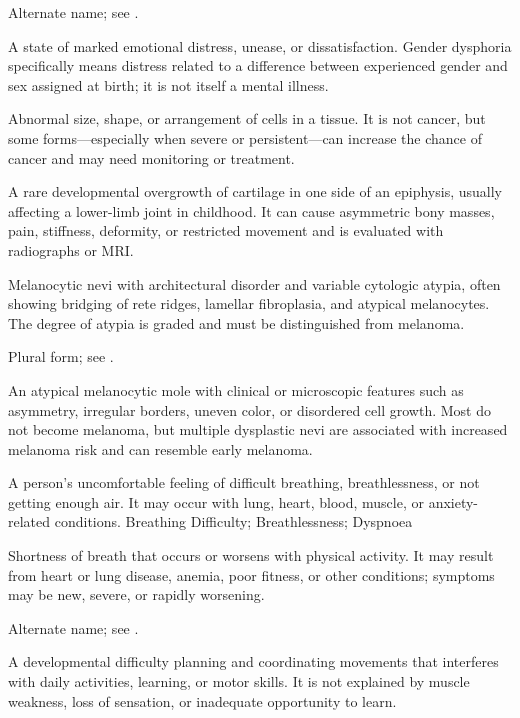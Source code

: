  Alternate name; see .

 A state of marked emotional distress, unease, or dissatisfaction. Gender dysphoria specifically means distress related to a difference between experienced gender and sex assigned at birth; it is not itself a mental illness.

 Abnormal size, shape, or arrangement of cells in a tissue. It is not cancer, but some forms—especially when severe or persistent—can increase the chance of cancer and may need monitoring or treatment.

 A rare developmental overgrowth of cartilage in one side of an epiphysis, usually affecting a lower-limb joint in childhood. It can cause asymmetric bony masses, pain, stiffness, deformity, or restricted movement and is evaluated with radiographs or MRI.

 Melanocytic nevi with architectural disorder and variable cytologic atypia, often showing bridging of rete ridges, lamellar fibroplasia, and atypical melanocytes. The degree of atypia is graded and must be distinguished from melanoma.

 Plural form; see .

 An atypical melanocytic mole with clinical or microscopic features such as asymmetry, irregular borders, uneven color, or disordered cell growth. Most do not become melanoma, but multiple dysplastic nevi are associated with increased melanoma risk and can resemble early melanoma.

 A person’s uncomfortable feeling of difficult breathing, breathlessness, or not getting enough air. It may occur with lung, heart, blood, muscle, or anxiety-related conditions.
\synonyms
Breathing Difficulty; Breathlessness; Dyspnoea

 Shortness of breath that occurs or worsens with physical activity. It may result from heart or lung disease, anemia, poor fitness, or other conditions; symptoms may be new, severe, or rapidly worsening.

 Alternate name; see .

 A developmental difficulty planning and coordinating movements that interferes with daily activities, learning, or motor skills. It is not explained by muscle weakness, loss of sensation, or inadequate opportunity to learn.

